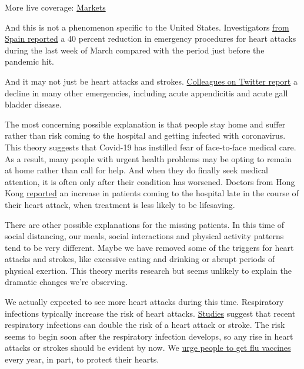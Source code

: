 More live coverage:
\href{https://www.nytimes3xbfgragh.onion/live/2020/09/11/business/stock-market-today-coronavirus?action=click\&pgtype=Article\&state=default\&region=MAIN_CONTENT_1\&context=storylines_live_updates}{Markets}

And this is not a phenomenon specific to the United States.
Investigators
\href{https://www.recintervcardiol.org/es/?option=com_content\&view=article\&id=344\&catid=14}{from
Spain reported} a 40 percent reduction in emergency procedures for heart
attacks during the last week of March compared with the period just
before the pandemic hit.

And it may not just be heart attacks and strokes.
\href{https://twitter.com/MandaChelednik/status/1246793095032852480?s=20}{Colleagues
on Twitter report} a decline in many other emergencies, including acute
appendicitis and acute gall bladder disease.

The most concerning possible explanation is that people stay home and
suffer rather than risk coming to the hospital and getting infected with
coronavirus. This theory suggests that Covid-19 has instilled fear of
face-to-face medical care. As a result, many people with urgent health
problems may be opting to remain at home rather than call for help. And
when they do finally seek medical attention, it is often only after
their condition has worsened. Doctors from Hong Kong
\href{https://www.ahajournals.org/doi/10.1161/CIRCOUTCOMES.120.006631}{reported}
an increase in patients coming to the hospital late in the course of
their heart attack, when treatment is less likely to be lifesaving.

There are other possible explanations for the missing patients. In this
time of social distancing, our meals, social interactions and physical
activity patterns tend to be very different. Maybe we have removed some
of the triggers for heart attacks and strokes, like excessive eating and
drinking or abrupt periods of physical exertion. This theory merits
research but seems unlikely to explain the dramatic changes we're
observing.

We actually expected to see more heart attacks during this time.
Respiratory infections typically increase the risk of heart attacks.
\href{https://www.ncbi.nlm.nih.gov/pmc/articles/PMC3139921/}{Studies}
suggest that recent respiratory infections can double the risk of a
heart attack or stroke. The risk seems to begin soon after the
respiratory infection develops, so any rise in heart attacks or strokes
should be evident by now. We
\href{https://www.cardiosmart.org/News-and-Events/2019/03/Flu-Shot-Helps-Prevent-Heart-Attack}{urge
people to get flu vaccines} every year, in part, to protect their
hearts.


